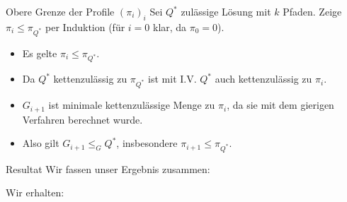 \begin{frame}{Obere Grenze der Profile $(\pi_i)_i$}
Sei $Q^*$ zulässige Lösung mit $k$ Pfaden.
Zeige $\pi_i \leq \pi_{Q^*}$ per Induktion (für $i=0$ klar, da $\pi_0 = 0$).
\begin{itemize}
\pause\item Es gelte $\pi_i \leq \pi_{Q^*}$.
\pause\item Da $Q^*$ kettenzulässig zu $\pi_{Q^*}$ ist mit I.V. $Q^*$ auch kettenzulässig zu $\pi_i$.
\pause\item $G_{i+1}$ ist minimale kettenzulässige Menge zu $\pi_i$, da sie mit dem gierigen Verfahren berechnet wurde.
\pause\item Also gilt $G_{i+1} \leq_G Q^*$, insbesondere $\pi_{i+1} \leq \pi_{Q^*}$.
\end{itemize}
\end{frame}

\begin{frame}{Resultat}
	Wir fassen unser Ergebnis zusammen:
	\begin{itemize}
	\end{itemize}
	Wir erhalten:
\end{frame}